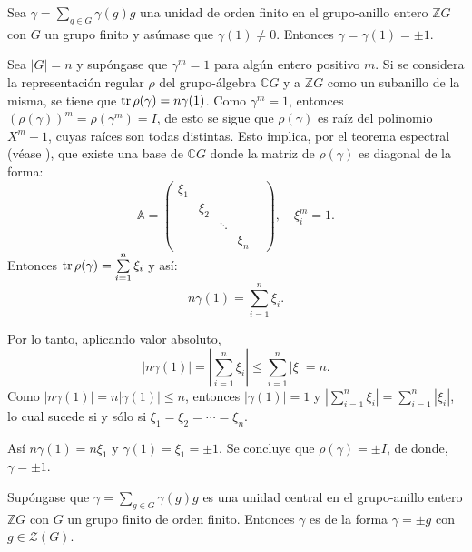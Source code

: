 \begin{lema}\label{lem:BH}
Sea $\gamma = \sum_{g \in G}\gamma(g)g$ una unidad de orden finito en el grupo-anillo entero  $\mathds{Z}G$ con $G$ un grupo finito y asúmase que $\gamma(1)\neq 0$. Entonces $\gamma = \gamma(1) = \pm 1.$
\end{lema}
\begin{proof*}
Sea $|G| = n$ y supóngase que $\gamma^{m} = 1$ para algún entero positivo $m$. Si se considera la representación regular $\rho$ del grupo-álgebra $\mathds{C}G$ y a $\mathds{Z}G$ como un subanillo de la misma, se tiene que $\operatorname{tr}\rho(\gamma) = n\gamma(1)$.
Como $\gamma^{m} = 1$, entonces $\left( \rho(\gamma) \right)^m = \rho(\gamma^{m}) = I$, de esto se sigue que $\rho(\gamma)$ es raíz del polinomio $X^m-1$, cuyas raíces son todas distintas. Esto implica, por el teorema espectral (véase \cite[214]{bib:lang}), que existe una base de $\mathds{C}G$ donde la matriz de $\rho(\gamma)$ es diagonal de la forma:
\begin{equation*}
\mathds{A} = \begin{pmatrix}
\xi_1 & & & &\\
 & \xi_2 & & \\
 & & \ddots & \\
  & & & \xi_n
\end{pmatrix}, \quad \xi_i^m = 1.
\end{equation*}
 Entonces $\operatorname{tr}\rho(\gamma) = \sum\limits_{i = 1}^{n}\xi_i$ y así:
 \begin{equation*}
 n\gamma(1) = \sum\limits_{i =1}^{n}\xi_i.
 \end{equation*}
 
 Por lo tanto, aplicando valor absoluto,
 \begin{equation*}
  |n\gamma(1)| = \left| \sum_{i = 1}^{n}\xi_i \right| \leq \sum_{i = 1}^{n}|\xi| = n.
 \end{equation*}
 Como $|n\gamma(1)| = n|\gamma(1)| \leq n$, entonces $|\gamma(1)| = 1$ y $\left| \sum_{i = 1}^{n}\xi_i \right| = \sum\limits_{i = 1}^{n}| \xi_i|$, lo cual sucede si y sólo si $\xi_1=\xi_2=\cdots = \xi_n$.
 
 Así $n\gamma(1) = n\xi_1$ y $\gamma(1) = \xi_1=\pm 1$. Se concluye que $\rho(\gamma) = \pm I$, de donde, $\gamma = \pm 1$.
\end{proof*}
\begin{corolario}
Supóngase que $\gamma = \sum_{g \in G}\gamma(g)g$ es una unidad central en el grupo-anillo entero $\mathds{Z}G$ con $G$ un grupo finito de orden finito. Entonces $\gamma$ es de la forma $\gamma = \pm g$ con $g \in  \mathcal{Z}(G)$.
\end{corolario}
